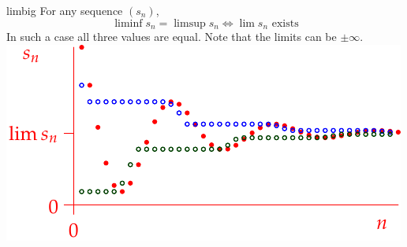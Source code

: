 \begin{thm}[lower separated=false, sidebyside, sidebyside align=top seam, sidebyside gap=0pt, righthand width=0.48\linewidth]{}{limbig}
	For any sequence $(s_n)$,
	\[
		\liminf s_n=\limsup s_n \iff\lim s_n\text{ exists}
	\]
	In such a case all three values are equal.\smallbreak
	Note that the limits can be $\pm\infty$.
	\tcblower
	\hfill\includegraphics[scale=0.8]{limsup1}
\end{thm}




